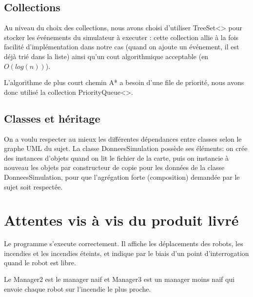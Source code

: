\documentclass[a4paper,11pt]{article}
\begin{document}
\subsection{Collections}

Au niveau du choix des collections, nous avons choisi d'utiliser TreeSet<> pour stocker les événements du simulateur à executer : cette collection allie à la fois facilité d'implémentation dans notre cas (quand on ajoute un événement, il est déjà trié dans la liste) ainsi qu'un cout algorithmique acceptable (en $O(log(n))$).

L'algorithme de plus court chemin A* a besoin d'une file de priorité, nous avons donc utilisé la collection PriorityQueue<>.

\subsection{Classes et héritage}

On a voulu respecter au mieux les différentes dépendances entre classes selon le graphe UML du sujet. 
La classe DonneesSimulation possède ses éléments: on crée des instances d'objets quand on lit le fichier de la carte, puis on instancie à nouveau les objets par constructeur de copie pour les données de la classe DonneesSimulation, pour que l'agrégation forte (composition) demandée par le sujet soit respectée.


\section{Attentes vis à vis du produit livré}

Le programme s'execute correctement. Il affiche les déplacements des robots, les incendies et les incendies éteints, et indique par le biais d'un point d'interrogation quand le robot est libre.

Le Manager2 est le manager naif et Manager3 est un manager moins naif qui envoie chaque robot sur l'incendie le plus proche.
\end{document}
